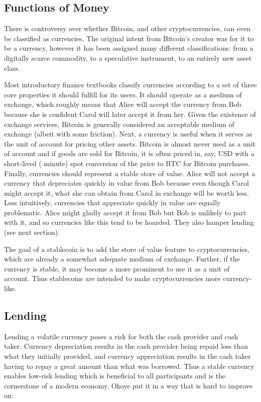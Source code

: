 \subsection{Functions of Money}
 
There is controversy over whether Bitcoin, and other cryptocurrencies, can even be classified as currencies. The original intent from Bitcoin's creator was for it to be a currency, however it has been assigned many different classifications: from a digitally scarce commodity, to a speculative instrument, to an entirely new asset class. 

Most introductory finance textbooks classify currencies according to a set of three core properties it should fulfill for its users. It should operate as a medium of exchange, which roughly means that Alice will accept the currency from Bob because she is confident Carol will later accept it from her. Given the existence of exchange services, Bitcoin is generally considered an acceptable medium of exchange (albeit with some friction). Next, a currency is useful when it serves as the unit of account for pricing other assets. Bitcoin is almost never used as a unit of account and if goods are sold for Bitcoin, it is often priced in, say, USD with a short-lived ( minute) spot conversion of the price to BTC for Bitcoin purchases. Finally, currencies should represent a stable store of value. Alice will not accept a currency that depreciates quickly in value from Bob because even though Carol might accept it, what she can obtain from Carol in exchange will be worth less. Less intuitively, currencies that appreciate quickly in value are equally problematic. Alice might gladly accept it from Bob but Bob is unlikely to part with it, and so currencies like this tend to be hoarded. They also hamper lending (see next section).

The goal of a stablecoin is to add the store of value feature to cryptocurrencies, which are already a somewhat adequate medium of exchange. Further, if the currency is stable, it may become a more prominent to use it as a unit of account. Thus stablecoins are intended to make cryptocurrencies more currency-like.


\subsection{Lending}

Lending a volatile currency poses a risk for both the cash provider and cash taker. Currency depreciation results in the cash provider being repaid less than what they initially provided, and currency appreciation results in the cash taker having to repay a great amount than what was borrowed. Thus a stable currency enables low-risk lending which is beneficial to all participants and is the cornerstone of a modern economy. Okoye \etal put it in a way that is hard to improve on:

